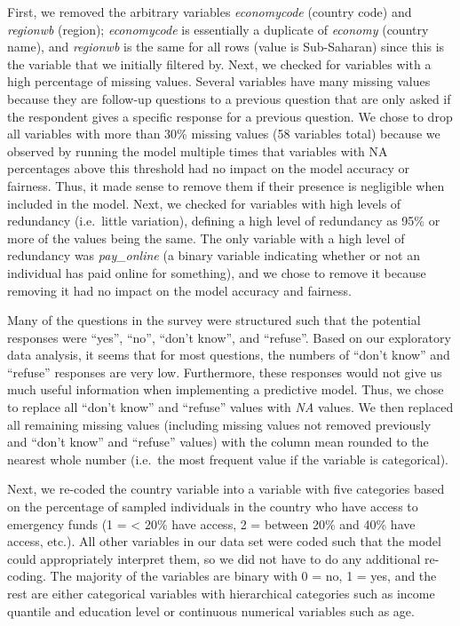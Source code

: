 \documentclass[water,article,submit,moreauthors,pdftex]{mdpi}
\begin{document}
First, we removed the arbitrary variables \emph{economycode} (country
code) and \emph{regionwb} (region); \emph{economycode} is essentially a
duplicate of \emph{economy} (country name), and \emph{regionwb} is the
same for all rows (value is Sub-Saharan) since this is the variable that
we initially filtered by. Next, we checked for variables with a high
percentage of missing values. Several variables have many missing values
because they are follow-up questions to a previous question that are
only asked if the respondent gives a specific response for a previous
question. We chose to drop all variables with more than 30\% missing
values (58 variables total) because we observed by running the model
multiple times that variables with NA percentages above this threshold
had no impact on the model accuracy or fairness. Thus, it made sense to
remove them if their presence is negligible when included in the model.
Next, we checked for variables with high levels of redundancy
(i.e.~little variation), defining a high level of redundancy as 95\% or
more of the values being the same. The only variable with a high level
of redundancy was \emph{pay\_online} (a binary variable indicating
whether or not an individual has paid online for something), and we
chose to remove it because removing it had no impact on the model
accuracy and fairness.

Many of the questions in the survey were structured such that the
potential responses were ``yes'', ``no'', ``don't know'', and
``refuse''. Based on our exploratory data analysis, it seems that for
most questions, the numbers of ``don't know'' and ``refuse'' responses
are very low. Furthermore, these responses would not give us much useful
information when implementing a predictive model. Thus, we chose to
replace all ``don't know'' and ``refuse'' values with \emph{NA} values.
We then replaced all remaining missing values (including missing values
not removed previously and ``don't know'' and ``refuse'' values) with
the column mean rounded to the nearest whole number (i.e.~the most
frequent value if the variable is categorical).

Next, we re-coded the country variable into a variable with five
categories based on the percentage of sampled individuals in the country
who have access to emergency funds (1 = \textless{} 20\% have access, 2
= between 20\% and 40\% have access, etc.). All other variables in our
data set were coded such that the model could appropriately interpret
them, so we did not have to do any additional re-coding. The majority of
the variables are binary with 0 = no, 1 = yes, and the rest are either
categorical variables with hierarchical categories such as income
quantile and education level or continuous numerical variables such as
age.
\end{document}
